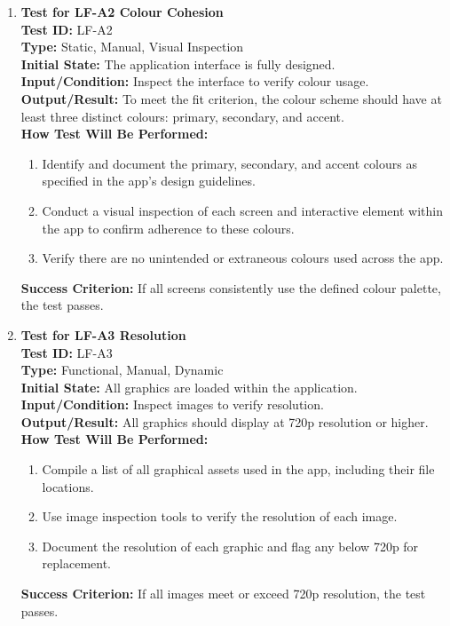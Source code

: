 \documentclass[12pt, titlepage]{article}
\begin{document}
\begin{enumerate}
    \item \textbf{Test for LF-A2 Colour Cohesion} \\
      \newline
      \textbf{Test ID:} LF-A2 \\
      \textbf{Type:} Static, Manual, Visual Inspection \\
      \textbf{Initial State:} The application interface is fully designed. \\
      \textbf{Input/Condition:} Inspect the interface to verify colour usage. \\
      \textbf{Output/Result:} To meet the fit criterion, the colour scheme should have at least three distinct colours: primary, 
      secondary, and accent. \\
      \textbf{How Test Will Be Performed:}
      \begin{enumerate}
          \item Identify and document the primary, secondary, and accent colours as specified in the app's design guidelines.
          \item Conduct a visual inspection of each screen and interactive element within the app to confirm adherence to these colours.
          \item Verify there are no unintended or extraneous colours used across the app.
      \end{enumerate}
      \textbf{Success Criterion:} If all screens consistently use the defined colour palette, the test passes.

    \item \textbf{Test for LF-A3 Resolution} \\
      \newline
      \textbf{Test ID:} LF-A3 \\
      \textbf{Type:} Functional, Manual, Dynamic \\
      \textbf{Initial State:} All graphics are loaded within the application. \\
      \textbf{Input/Condition:} Inspect images to verify resolution. \\
      \textbf{Output/Result:} All graphics should display at 720p resolution or higher. \\
      \textbf{How Test Will Be Performed:}
      \begin{enumerate}
          \item Compile a list of all graphical assets used in the app, including their file locations.
          \item Use image inspection tools to verify the resolution of each image.
          \item Document the resolution of each graphic and flag any below 720p for replacement.
      \end{enumerate}
      \textbf{Success Criterion:} If all images meet or exceed 720p resolution, the test passes.


\end{enumerate}
\end{document}
